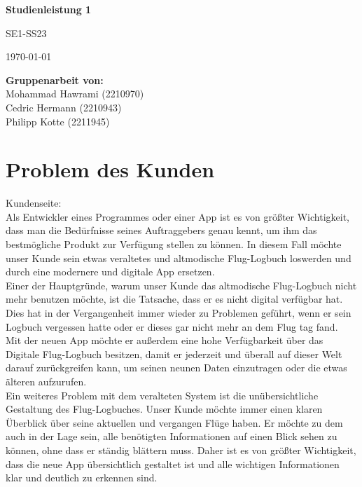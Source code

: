 \documentclass[a4paper]{article} %
\newcommand{\question}[2][]{\begin{flushleft}
        \textbf{Frage #1}: \textit{#2}

\end{flushleft}}
\newcommand{\maketitletwo}[2][]{\begin{center}
        \vspace*{50pt}

        \Huge{\textbf{Studienleistung 1}

            SE1-SS23} %
        \vspace{5pt}
        
        \Large{\today}
        \vspace{350pt}

        \vspace{15pt}
        
    \end{center}

    \begin{flushleft}
        \normalsize\Large{
            \textbf{Gruppenarbeit von:}\\Mohammad Hawrami (2210970)\\Cedric Hermann (2210943)\\Philipp Kotte (2211945) %
        }  
    \end{flushleft}
}
\begin{document}
    \maketitletwo[1]  %
    
    \pagebreak

    \vspace*{10pt}
    \tableofcontents

    \pagebreak

    \section{Problem des Kunden}
    \vspace{1cm}
    Kundenseite:\\
    Als Entwickler eines Programmes oder einer App ist es von größter Wichtigkeit, dass man die Bedürfnisse seines Auftraggebers genau kennt, um ihm das bestmögliche Produkt zur Verfügung stellen zu können. In diesem Fall möchte unser Kunde sein etwas veraltetes und altmodische Flug-Logbuch loswerden und durch eine modernere und digitale App ersetzen.\\
    Einer der Hauptgründe, warum unser Kunde das altmodische Flug-Logbuch nicht mehr benutzen möchte, ist die Tatsache, dass er es nicht digital verfügbar hat. Dies hat in der Vergangenheit immer wieder zu Problemen geführt, wenn er sein Logbuch vergessen hatte oder er dieses gar nicht mehr an dem Flug tag fand.\\
    Mit der neuen App möchte er außerdem eine hohe Verfügbarkeit über das Digitale Flug-Logbuch besitzen, damit er jederzeit und überall auf dieser Welt darauf zurückgreifen kann, um seinen neunen Daten einzutragen oder die etwas älteren aufzurufen.\\
    Ein weiteres Problem mit dem veralteten System ist die unübersichtliche Gestaltung des Flug-Logbuches. Unser Kunde möchte immer einen klaren Überblick über seine aktuellen und vergangen Flüge haben. Er möchte zu dem auch in der Lage sein, alle benötigten Informationen auf einen Blick sehen zu können, ohne dass er ständig blättern muss. Daher ist es von größter Wichtigkeit, dass die neue App übersichtlich gestaltet ist und alle wichtigen Informationen klar und deutlich zu erkennen sind.\\
    
\end{document}
